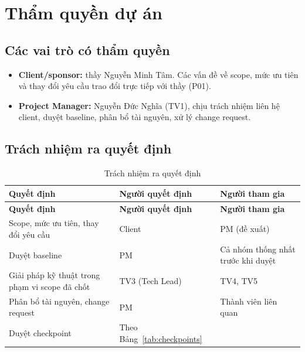 \section{Thẩm quyền dự án}
\label{sec:1-5}
\subsection*{Các vai trò có thẩm quyền}
\begin{itemize}
  \item \textbf{Client/sponsor:} thầy Nguyễn Minh Tâm. Các vấn đề về scope, mức ưu tiên và thay đổi yêu cầu trao đổi trực tiếp với thầy (P01).
  \item \textbf{Project Manager:} Nguyễn Đức Nghĩa (TV1), chịu trách nhiệm liên hệ client, duyệt baseline, phân bổ tài nguyên, xử lý change request.
\end{itemize}

\subsection*{Trách nhiệm ra quyết định}

\begingroup\tblsetup\tblzebra
\begin{longtable}{L{6.0cm}L{4.0cm}L{4.0cm}}
\caption{Trách nhiệm ra quyết định}\label{tab:decision-rights}\\
\toprule
{}\textbf{Quyết định} & \textbf{Người quyết định} & \textbf{Người tham gia} \\
\midrule
\endfirsthead
\toprule
{}\textbf{Quyết định} & \textbf{Người quyết định} & \textbf{Người tham gia} \\
\midrule
\endhead
\bottomrule
\endlastfoot
Scope, mức ưu tiên, thay đổi yêu cầu & Client & PM (đề xuất) \\
Duyệt baseline & PM & Cả nhóm thống nhất trước khi duyệt \\
Giải pháp kỹ thuật trong phạm vi scope đã chốt & TV3 (Tech Lead) & TV4, TV5 \\
Phân bổ tài nguyên, change request & PM & Thành viên liên quan \\
Duyệt checkpoint & Theo Bảng~\ref{tab:checkpoints} & \\
\end{longtable}
\endgroup

